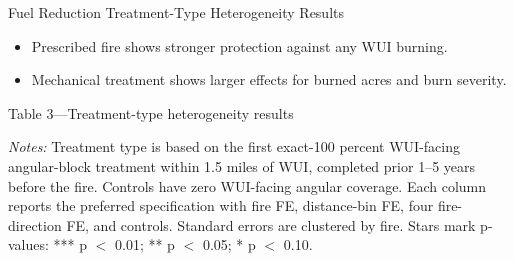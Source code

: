\documentclass[10pt,aspectratio=169]{beamer}
\begin{document}
\begin{frame}{Fuel Reduction Treatment-Type Heterogeneity Results}
  
    \begin{itemize}
    \item Prescribed fire shows stronger protection against any WUI burning.
    \item Mechanical treatment shows larger effects for burned acres and burn severity.
  \end{itemize}
  \centering
  {\small Table 3---Treatment-type heterogeneity results}


  \small
  \setlength{\tabcolsep}{2.8pt}
  \renewcommand{\arraystretch}{1.0}
  \vspace{0.15em}

  \begin{minipage}{1\textwidth}
    \tiny
  \textit{Notes:} Treatment type is based on the first exact-100 percent WUI-facing angular-block treatment within 1.5 miles of WUI, completed prior 1--5 years before the fire. Controls have zero WUI-facing angular coverage. Each column reports the preferred specification with fire FE, distance-bin FE, four fire-direction FE, and controls. Standard errors are clustered by fire. Stars mark p-values: *** p $<$ 0.01; ** p $<$ 0.05; * p $<$ 0.10.
  \end{minipage}
  \renewcommand{\arraystretch}{1}
\end{frame}
\end{document}
